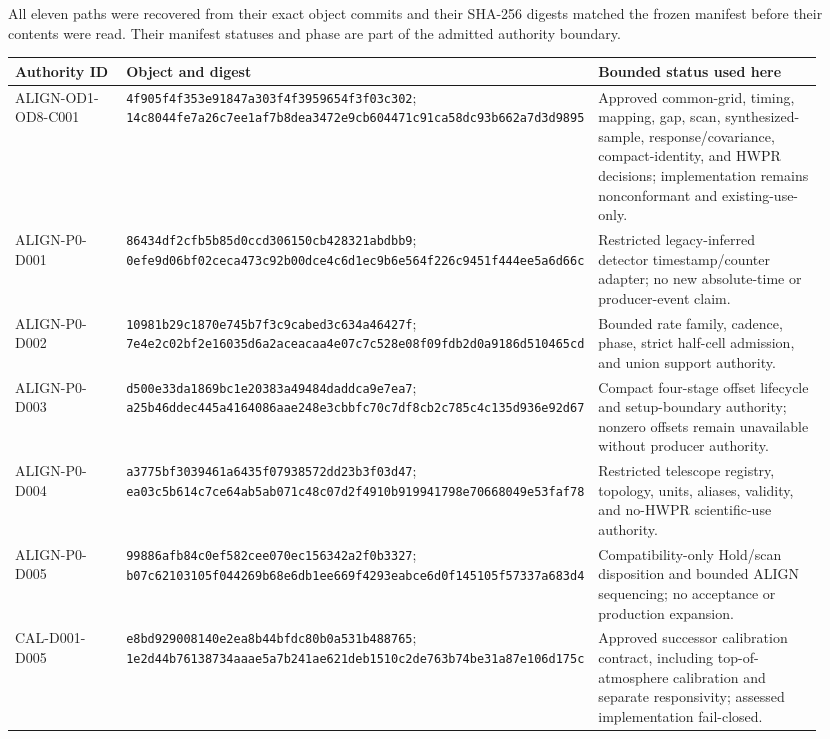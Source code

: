 \documentclass[11pt]{article}
\newcommand{\code}[1]{\nolinkurl{#1}}
\begin{document}
All eleven paths were recovered from their exact object commits and their
SHA-256 digests matched the frozen manifest before their contents were read.
Their manifest statuses and phase are part of the admitted authority boundary.

\begin{longtable}{@{}p{0.20\linewidth}p{0.27\linewidth}p{0.47\linewidth}@{}}
\toprule
Authority ID & Object and digest & Bounded status used here \\
\midrule
\endhead
ALIGN-OD1-OD8-C001 &
\code{4f905f4f353e91847a303f4f3959654f3f03c302};
\code{14c8044fe7a26c7ee1af7b8dea3472e9cb604471c91ca58dc93b662a7d3d9895} &
Approved common-grid, timing, mapping, gap, scan, synthesized-sample,
response/covariance, compact-identity, and HWPR decisions; implementation
remains nonconformant and existing-use-only. \\
ALIGN-P0-D001 &
\code{86434df2cfb5b85d0ccd306150cb428321abdbb9};
\code{0efe9d06bf02ceca473c92b00dce4c6d1ec9b6e564f226c9451f444ee5a6d66c} &
Restricted legacy-inferred detector timestamp/counter adapter; no new
absolute-time or producer-event claim. \\
ALIGN-P0-D002 &
\code{10981b29c1870e745b7f3c9cabed3c634a46427f};
\code{7e4e2c02bf2e16035d6a2aceacaa4e07c7c528e08f09fdb2d0a9186d510465cd} &
Bounded rate family, cadence, phase, strict half-cell admission, and union
support authority. \\
ALIGN-P0-D003 &
\code{d500e33da1869bc1e20383a49484daddca9e7ea7};
\code{a25b46ddec445a4164086aae248e3cbbfc70c7df8cb2c785c4c135d936e92d67} &
Compact four-stage offset lifecycle and setup-boundary authority; nonzero
offsets remain unavailable without producer authority. \\
ALIGN-P0-D004 &
\code{a3775bf3039461a6435f07938572dd23b3f03d47};
\code{ea03c5b614c7ce64ab5ab071c48c07d2f4910b919941798e70668049e53faf78} &
Restricted telescope registry, topology, units, aliases, validity, and no-HWPR
scientific-use authority. \\
ALIGN-P0-D005 &
\code{99886afb84c0ef582cee070ec156342a2f0b3327};
\code{b07c62103105f044269b68e6db1ee669f4293eabce6d0f145105f57337a683d4} &
Compatibility-only Hold/scan disposition and bounded ALIGN sequencing; no
acceptance or production expansion. \\
CAL-D001-D005 &
\code{e8bd929008140e2ea8b44bfdc80b0a531b488765};
\code{1e2d44b76138734aaae5a7b241ae621deb1510c2de763b74be31a87e106d175c} &
Approved successor calibration contract, including top-of-atmosphere
calibration and separate responsivity; assessed implementation fail-closed. \\

\end{longtable}
\end{document}
